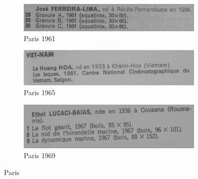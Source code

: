 \documentclass[a4paper,12pt,twoside]{book}
\begin{document}
	\begin{figure}
		\begin{subfigure}{0.5\textwidth}
		\includegraphics[scale=0.4]{paris1961.png}
		\centering
		\caption{Paris 1961}
	\end{subfigure}
		\begin{subfigure}{0.5\textwidth}
		\includegraphics[scale=0.5]{paris1965.png}
		\centering
		\caption{Paris 1965}
	\end{subfigure}
		\begin{subfigure}{0.5\textwidth}
		\includegraphics[scale=0.5]{paris1969.png}
		\centering
		\caption{Paris 1969}
	\end{subfigure}
	\caption{Paris}
	\end{figure}
	
	
	
\end{document}
